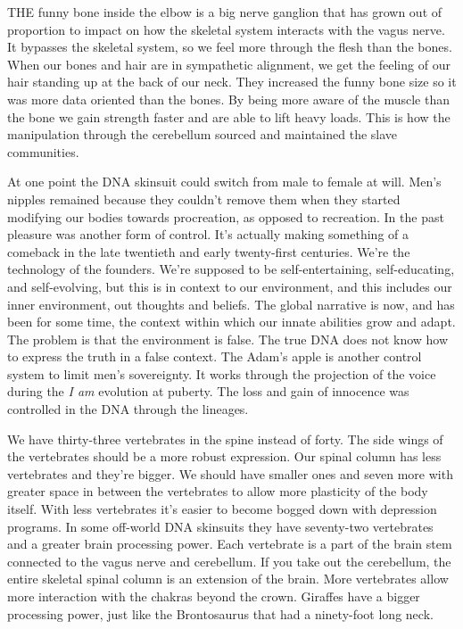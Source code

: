 THE funny bone inside the elbow is a big nerve ganglion that has grown
out of proportion to impact on how the skeletal system interacts with
the vagus nerve. It bypasses the skeletal system, so we feel more
through the flesh than the bones. When our bones and hair are in
sympathetic alignment, we get the feeling of our hair standing up at the
back of our neck. They increased the funny bone size so it was more data
oriented than the bones. By being more aware of the muscle than the bone
we gain strength faster and are able to lift heavy loads. This is how
the manipulation through the cerebellum sourced and maintained the slave
communities.

At one point the DNA skinsuit could switch from male to female at will.
Men's nipples remained because they couldn't remove them when they
started modifying our bodies towards procreation, as opposed to
recreation. In the past pleasure was another form of control. It's
actually making something of a comeback in the late twentieth and early
twenty-first centuries. We're the technology of the founders. We're
supposed to be self-entertaining, self-educating, and self-evolving, but
this is in context to our environment, and this includes our inner
environment, out thoughts and beliefs. The global narrative is now, and
has been for some time, the context within which our innate abilities
grow and adapt. The problem is that the environment is false. The true
DNA does not know how to express the truth in a false context. The
Adam's apple is another control system to limit men's sovereignty. It
works through the projection of the voice during the \emph{I am}
evolution at puberty. The loss and gain of innocence was controlled in
the DNA through the lineages.

We have thirty-three vertebrates in the spine instead of forty. The side
wings of the vertebrates should be a more robust expression. Our spinal
column has less vertebrates and they're bigger. We should have smaller
ones and seven more with greater space in between the vertebrates to
allow more plasticity of the body itself. With less vertebrates it's
easier to become bogged down with depression programs. In some off-world
DNA skinsuits they have seventy-two vertebrates and a greater brain
processing power. Each vertebrate is a part of the brain stem connected
to the vagus nerve and cerebellum. If you take out the cerebellum, the
entire skeletal spinal column is an extension of the brain. More
vertebrates allow more interaction with the chakras beyond the crown.
Giraffes have a bigger processing power, just like the Brontosaurus that
had a ninety-foot long neck.

